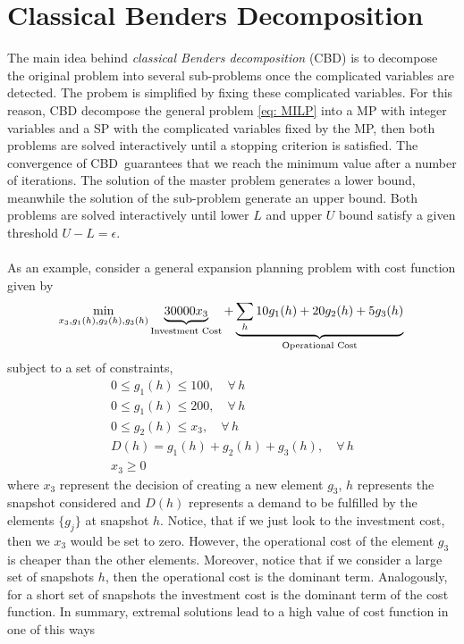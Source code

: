 \section{Classical Benders Decomposition}
The main idea behind \textit{classical Benders decomposition} (CBD) is to decompose the original problem into several sub-problems once the complicated variables are detected. The probem is simplified by fixing these complicated variables. For this reason, CBD decompose the general problem \eqref{eq: MILP} into a MP with integer variables and a SP with the complicated variables fixed by the MP, then both problems are solved interactively until a stopping criterion is satisfied. The convergence of CBD\,\cite{Sahinidis1991BDConvergence} guarantees that we reach the minimum value after a number of iterations. The solution of the master problem generates a lower bound, meanwhile the solution of the sub-problem generate an upper bound. Both problems are solved interactively until lower $L$ and upper $U$ bound satisfy a given threshold $U - L = \epsilon$.\\\\
As an example, consider a general expansion planning problem with cost function given by
\begin{equation}
    \min_{x_{3},g_{1}(h),g_{2}(h),g_{3}(h)}\underbrace{30000x_{3}}_{\text{Investment Cost}} + \underbrace{\sum_{h}10g_{1}(h)+20g_{2}(h) + 5g_{3}(h)}_{\text{Operational Cost}}\\ 
\end{equation}
subject to a set of constraints,
\begin{align}
    0 \leq g_{1}(h) \leq 100, \quad \forall\,h\\
    0 \leq g_{1}(h) \leq 200, \quad \forall\,h\\
    0 \leq g_{2}(h) \leq x_{3}, \quad \forall\,h \\
    D(h) = g_{1}(h) + g_{2}(h) + g_{3}(h), \quad \forall\,h \\
    x_{3} \geq 0
\end{align}
where $x_{3}$ represent the decision of creating a new element $g_{3}$, $h$ represents the snapshot considered and $D(h)$ represents a demand to be fulfilled by the elements $\{g_{j}\}$ at snapshot $h$. Notice, that if we just look to the investment cost, then we $x_{3}$ would be set to zero. However, the operational cost of the element $g_{3}$ is cheaper than the other elements. Moreover, notice that if we consider a large set of snapshots $h$, then the operational cost is the dominant term. Analogously, for a short set of snapshots the investment cost is the dominant term of the cost function. In summary, extremal solutions lead to a high value of cost function in one of this ways

